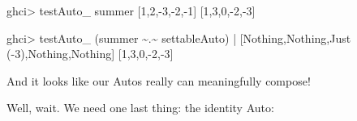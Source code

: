 \documentclass[]{article}
\newenvironment{Shaded}{}{}
\newcommand{\CommentTok}[1]{\textcolor[rgb]{0.38,0.63,0.69}{\textit{#1}}}
\newcommand{\DataTypeTok}[1]{\textcolor[rgb]{0.56,0.13,0.00}{#1}}
\newcommand{\DecValTok}[1]{\textcolor[rgb]{0.25,0.63,0.44}{#1}}
\newcommand{\NormalTok}[1]{#1}
\newcommand{\OperatorTok}[1]{\textcolor[rgb]{0.40,0.40,0.40}{#1}}
\newcommand{\OtherTok}[1]{\textcolor[rgb]{0.00,0.44,0.13}{#1}}
\begin{document}
\begin{Shaded}
\begin{Highlighting}[]
\NormalTok{ghci}\OperatorTok{>}\NormalTok{ testAuto\_ summer [}\DecValTok{1}\NormalTok{,}\DecValTok{2}\NormalTok{,}\OperatorTok{{-}}\DecValTok{3}\NormalTok{,}\OperatorTok{{-}}\DecValTok{2}\NormalTok{,}\OperatorTok{{-}}\DecValTok{1}\NormalTok{]}
\NormalTok{[}\DecValTok{1}\NormalTok{,}\DecValTok{3}\NormalTok{,}\DecValTok{0}\NormalTok{,}\OperatorTok{{-}}\DecValTok{2}\NormalTok{,}\OperatorTok{{-}}\DecValTok{3}\NormalTok{]}

\NormalTok{ghci}\OperatorTok{>}\NormalTok{ testAuto\_ (summer }\OperatorTok{\textasciitilde{}.\textasciitilde{}}\NormalTok{ settableAuto)}
    \OperatorTok{|}\NormalTok{     [}\DataTypeTok{Nothing}\NormalTok{,}\DataTypeTok{Nothing}\NormalTok{,}\DataTypeTok{Just}\NormalTok{ (}\OperatorTok{{-}}\DecValTok{3}\NormalTok{),}\DataTypeTok{Nothing}\NormalTok{,}\DataTypeTok{Nothing}\NormalTok{]}
\NormalTok{[}\DecValTok{1}\NormalTok{,}\DecValTok{3}\NormalTok{,}\DecValTok{0}\NormalTok{,}\OperatorTok{{-}}\DecValTok{2}\NormalTok{,}\OperatorTok{{-}}\DecValTok{3}\NormalTok{]}
\end{Highlighting}
\end{Shaded}

And it looks like our Autos really can meaningfully compose!

Well, wait. We need one last thing: the identity Auto:

\begin{Shaded}
\end{Shaded}
\end{document}
